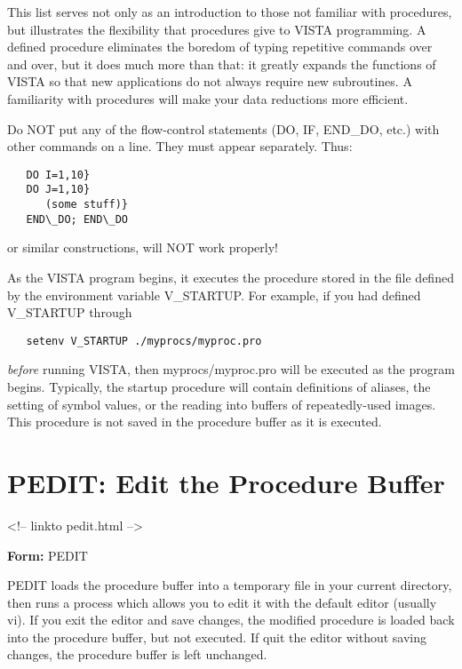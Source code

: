 This list serves not only as an introduction to those not familiar with
procedures, but illustrates the flexibility that procedures give to VISTA
programming.  A defined procedure eliminates the boredom of typing
repetitive commands over and over, but it does much more than that: it
greatly expands the functions of VISTA so that new applications do not
always require new subroutines.  A familiarity with procedures will make
your data reductions more efficient.

\newline
Do NOT put any of the flow-control statements (DO, IF, END\_DO, etc.) with
other commands on a line.  They must appear separately.  Thus:
\begin{verbatim}
   DO I=1,10}
   DO J=1,10}
      (some stuff)}
   END\_DO; END\_DO
\end{verbatim}
or similar constructions, will NOT work properly!

As the VISTA program begins, it executes the procedure stored in the file
defined by the environment variable V\_STARTUP.  For example, if you had
defined V\_STARTUP through
\begin{verbatim}
   setenv V_STARTUP ./myprocs/myproc.pro
\end{verbatim}
\textit{before} running VISTA, then myprocs/myproc.pro will be executed as the
program begins.  Typically, the startup procedure will contain definitions
of aliases, the setting of symbol values, or the reading into buffers of
repeatedly-used images.  This procedure is not saved in the procedure
buffer as it is executed.

\section{PEDIT: Edit the Procedure Buffer}
\begin{rawhtml}
<!-- linkto pedit.html -->
\end{rawhtml}

\begin{command}
  \item[\textbf{Form: } PEDIT\hfill]{}
\end{command}

PEDIT loads the procedure buffer into a temporary file in your current
directory, then runs a process which allows you to edit it with the default
editor (usually vi).  If you exit the editor and save changes, the modified
procedure is loaded back into the procedure buffer, but not executed.  If
quit the editor without saving changes, the procedure buffer is left
unchanged.

